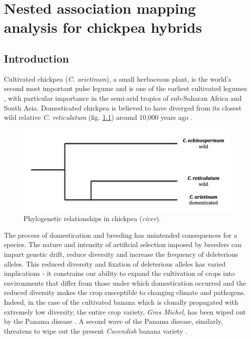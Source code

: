 \chapter{Nested association mapping analysis for chickpea hybrids}
\label{cha:research_topic_2}

\section{Introduction}

Cultivated chickpea (\textit{C. arietinum}), a small herbaceous plant, is the world's second most important pulse legume and is one of the earliest cultivated legumes \cite{vonWettberg2018, Sani2018}, with particular importance in the semi-arid tropics of sub-Saharan Africa and South Asia. Domesticated chickpea is believed to have diverged from its closest wild relative \textit{C. reticulatum} (fig. \ref{fig:cicer-phylo}) around 10,000 years ago \cite{vonWettberg2018}. 

\begin{figure}[h!]
    \centering
    \includegraphics[scale=0.8]{tex/chickpea/chickpea.png}
    \caption{Phylogenetic relationships in chickpea (\textit{cicer}).}
    \label{fig:cicer-phylo}
\end{figure}


The process of domestication and breeding has unintended consequences for a species. The nature and 
intensity of artificial selection imposed by breeders can impart genetic drift, reduce diversity and increase the frequency of deleterious alleles. This reduced diversity and fixation of deleterious alleles has varied implications - it constrains our ability to expand the cultivation of crops into environments that differ from those under which domestication occurred and the reduced diversity makes the crop susceptible to  changing climate and pathogens. Indeed, in the case of the cultivated banana which is clonally propagated with extremely low diversity, the entire crop variety, \emph{Gros Michel}, has been wiped out by the Panama disease \cite{Ordonez2015}. A second wave of the Panama disease, similarly, threatens to wipe out the present \emph{Cavendish} banana variety \cite{Ordonez2015}. 

